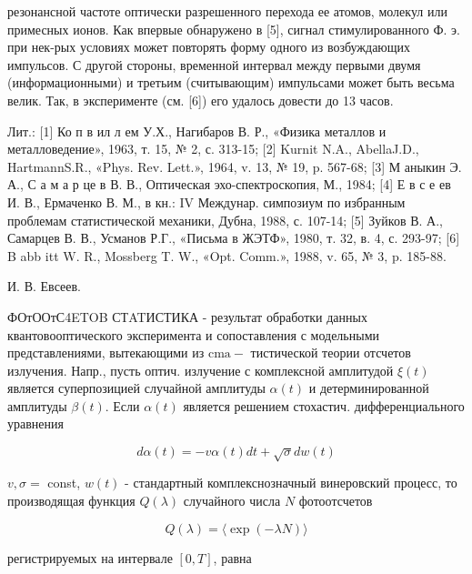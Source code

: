 \documentclass[10pt]{article}
\begin{document}
резонансной частоте оптически разрешенного перехода ее атомов, молекул или примесных ионов. Как впервые обнаружено в [5], сигнал стимулированного Ф. э. при нек-рых условиях может повторять форму одного из возбуждающих импульсов. С другой стороны, временной интервал между первыми двумя (информационными) и третьим (считывающим) импульсами может быть весьма велик. Так, в эксперименте (см. [6]) его удалось довести до 13 часов.



Лит.: [1] Ко п в ил л ем У.Х., Нагибаров В. Р., «Физика металлов и металловедение», 1963, т. 15, № 2, с. 313-15; [2] Kurnit N.A., AbellaJ.D., HartmannS.R., «Phys. Rev. Lett.», 1964, v. 13, № 19, p. 567-68; [3] М аныкин Э. А., С а м а р це в В. В., Оптическая эхо-спектроскопия, М., 1984; [4] Е в с е ев И. В., Ермаченко В. М., в кн.: IV Междунар. симпозиум по избранным проблемам статистической механики, Дубна, 1988, с. 107-14; [5] Зуйков В. А., Самарцев В. В., Усманов Р.Г., «Письма в ЖЭТФ», 1980, т. 32, в. 4, с. 293-97; [6] B abb itt W. R., Mossberg T. W., «Opt. Comm.», 1988, v. 65, № 3, p. 185-88.



И. В. Евсеев.



ФОтООтС4ETOB СТATИСТИКА - результат обработки данных квантовооптического эксперимента и сопоставления с модельными представлениями, вытекающими из $\mathrm{cma}-$ тистической теории отсчетов излучения. Напр., пусть оптич. излучение с комплексной амплитудой $\xi(t)$ является суперпозицией случайной амплитуды $\alpha(t)$ и детерминированной амплитуды $\beta(t)$. Если $\alpha(t)$ является решением стохастич. дифференциального уравнения



\[

d \alpha(t)=-v \alpha(t) d t+\sqrt{\sigma} d w(t)

\]



$v, \sigma=$ const, $w(t)$ - стандартный комплекснозначный винеровский процесс, то производящая функция $Q(\lambda)$ случайного числа $N$ фотоотсчетов



\[

Q(\lambda)=\langle\exp (-\lambda N)\rangle

\]



регистрируемых на интервале $[0, T]$, равна
\end{document}
